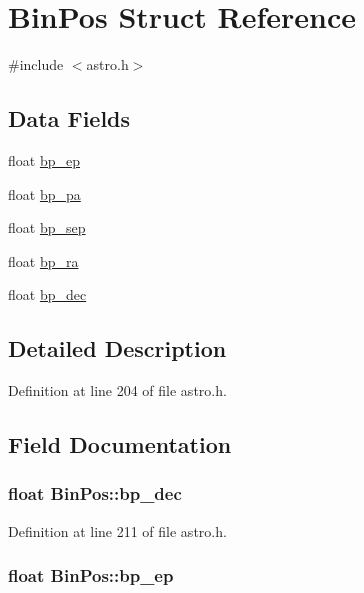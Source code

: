 \hypertarget{struct_bin_pos}{\section{Bin\-Pos Struct Reference}
\label{struct_bin_pos}
}


{\ttfamily \#include $<$astro.\-h$>$}

\subsection*{Data Fields}
\begin{DoxyCompactItemize}
\item 
float \hyperlink{struct_bin_pos_ac1be5dd479308de781c96b87e299d1a5}{bp\-\_\-ep}
\item 
float \hyperlink{struct_bin_pos_a5a2e7d4cb399601758b0c724ce5543d4}{bp\-\_\-pa}
\item 
float \hyperlink{struct_bin_pos_aa451101e51c051196ee5cc0f6d846f77}{bp\-\_\-sep}
\item 
float \hyperlink{struct_bin_pos_addd6fc5c935d61f90723a4848e70c86f}{bp\-\_\-ra}
\item 
float \hyperlink{struct_bin_pos_a39f7d71c18cff409e741dffc6fce94e4}{bp\-\_\-dec}
\end{DoxyCompactItemize}


\subsection{Detailed Description}


Definition at line 204 of file astro.\-h.



\subsection{Field Documentation}
\hypertarget{struct_bin_pos_a39f7d71c18cff409e741dffc6fce94e4}{
\subsubsection[{bp\-\_\-dec}]{\setlength{\rightskip}{0pt plus 5cm}float Bin\-Pos\-::bp\-\_\-dec}}\label{struct_bin_pos_a39f7d71c18cff409e741dffc6fce94e4}


Definition at line 211 of file astro.\-h.

\hypertarget{struct_bin_pos_ac1be5dd479308de781c96b87e299d1a5}{
\subsubsection[{bp\-\_\-ep}]{\setlength{\rightskip}{0pt plus 5cm}float Bin\-Pos\-::bp\-\_\-ep}}\label{struct_bin_pos_ac1be5dd479308de781c96b87e299d1a5}



